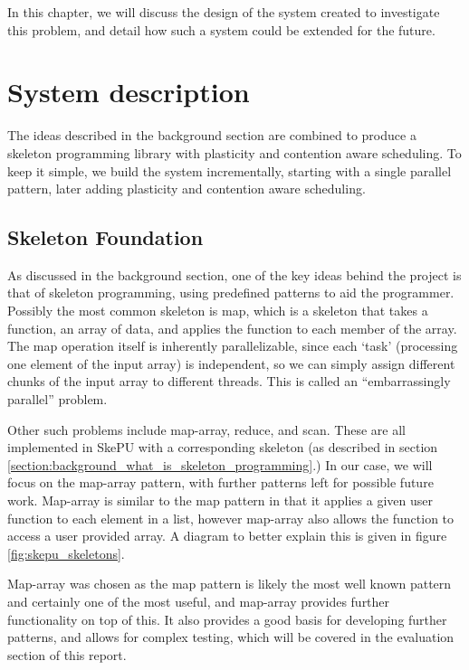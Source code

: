 
In this chapter, we will discuss the design of the system created to investigate this problem, and detail how such a system could be extended for the future.



\section{System description}

The ideas described in the background section are combined to produce a skeleton programming library with plasticity and contention aware scheduling. To keep it simple, we build the system incrementally, starting with a single parallel pattern, later adding plasticity and contention aware scheduling. 



\subsection{Skeleton Foundation}
\label{section:design_skeleton_foundation}

As discussed in the background section, one of the key ideas behind the project is that of skeleton programming, using predefined patterns to aid the programmer. Possibly the most common skeleton is map, which is a skeleton that takes a function, an array of data, and applies the function to each member of the array. The map operation itself is inherently parallelizable, since each `task' (processing one element of the input array) is independent, so we can simply assign different chunks of the input array to different threads. This is called an ``embarrassingly parallel'' problem. 

Other such problems include map-array, reduce, and scan. These are all implemented in SkePU with a corresponding skeleton (as described in section \ref{section:background_what_is_skeleton_programming}.) In our case, we will focus on the map-array pattern, with further patterns left for possible future work. Map-array is similar to the map pattern in that it applies a given user function to each element in a list, however map-array also allows the function to access a user provided array. A diagram to better explain this is given in figure \ref{fig:skepu_skeletons}.

Map-array was chosen as the map pattern is likely the most well known pattern and certainly one of the most useful, and map-array provides further functionality on top of this. It also provides a good basis for developing further patterns, and allows for complex testing, which will be covered in the evaluation section of this report.



